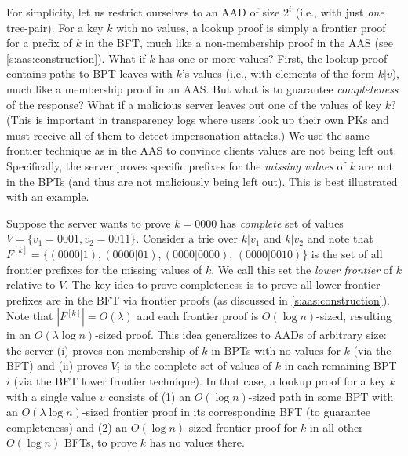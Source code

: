 For simplicity, let us restrict ourselves to an AAD of size $2^i$ (i.e., with just \textit{one} tree-pair).
For a key $k$ with no values, a lookup proof is simply a frontier proof for a prefix of $k$ in the BFT, much like a non-membership proof in the AAS (see \cref{s:aas:construction}).
What if $k$ has one or more values?
First, the lookup proof contains paths to BPT leaves with $k$'s values (i.e., with elements of the form $k|v$), much like a membership proof in an AAS.
But what is to guarantee \textit{completeness} of the response?
What if a malicious server leaves out one of the values of key $k$?
(This is important in transparency logs where users look up their own PKs and must receive all of them to detect impersonation attacks.)
We use the same frontier technique as in the AAS to convince clients values are not being left out.
Specifically, the server proves specific prefixes for the \textit{missing values} of $k$ are not in the BPTs (and thus are not maliciously being left out).
This is best illustrated with an example.

Suppose the server wants to prove $k=0000$ has \textit{complete} set of values $V=\{v_1 = 0001, v_2 = 0011\}$.
Consider a trie over $k|v_1$ and $k|v_2$ and note that $F^{[k]} = \{(0000|1), (0000|01), (0000|0000)$, $(0000|0010)\}$ is the set of all frontier prefixes for the missing values of $k$.
We call this set the \textit{lower frontier} of $k$ relative to $V$.
The key idea to prove completeness is to prove all lower frontier prefixes are in the BFT via frontier proofs (as discussed in \cref{s:aas:construction}).
Note that $|F^{[k]}| = O(\lambda)$ and each frontier proof is $O(\log{n})$-sized, resulting in an $O(\lambda \log{n})$-sized proof.
This idea generalizes to AADs of arbitrary size: the server (i) proves non-membership of $k$ in BPTs with no values for $k$ (via the BFT) and (ii) proves $V_i$ is the complete set of values of $k$ in each remaining BPT $i$ (via the BFT lower frontier technique).
In that case, a lookup proof for a key $k$ with a single value $v$ consists of (1) an $O(\log{n})$-sized path in some BPT with an $O(\lambda\log{n})$-sized frontier proof in its corresponding BFT (to guarantee completeness) and (2) an $O(\log{n})$-sized frontier proof for $k$ in all other $O(\log{n})$ BFTs, to prove $k$ has no values there.

